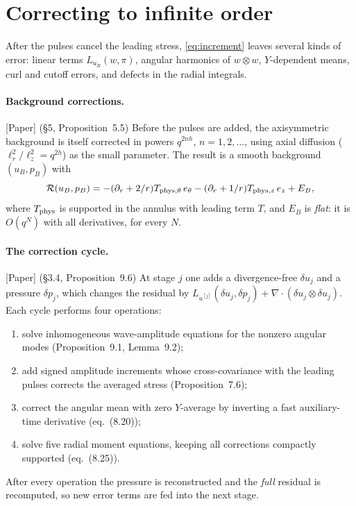 \documentclass[11pt]{article}
\newcommand{\Res}{\mathcal{R}}
\theoremstyle{plain}
\theoremstyle{remark}
\newcommand{\paper}{\textsf{\small[Paper]}}
\begin{document}
\section{Correcting to infinite order}\label{sec:cycle}

After the pulses cancel the leading stress, \eqref{eq:increment} leaves several kinds of error: linear terms $L_{u_B}(w,\pi)$, angular harmonics of $w\otimes w$, $Y$-dependent means, curl and cutoff errors, and defects in the radial integrals.

\paragraph{Background corrections.} \paper{} (\S5, Proposition~5.5) Before the pulses are added, the axisymmetric background is itself corrected in powers $q^{2nh}$, $n=1,2,\dots$, using axial diffusion ($\ell_r^2/\ell_z^2=q^{2h}$) as the small parameter. The result is a smooth background $(u_B,p_B)$ with
\[
\Res(u_B,p_B)=-(\partial_r+2/r)T_{{\rm phys},\theta}\,e_\theta-(\partial_r+1/r)T_{{\rm phys},z}\,e_z+E_B,
\]
where $T_{\rm phys}$ is supported in the annulus with leading term $T$, and $E_B$ is \emph{flat}: it is $O(q^N)$ with all derivatives, for every $N$.

\paragraph{The correction cycle.} \paper{} (\S3.4, Proposition~9.6) At stage $j$ one adds a divergence-free $\delta u_j$ and a pressure $\delta p_j$, which changes the residual by $L_{u^{[j]}}(\delta u_j,\delta p_j)+\nabla\cdot(\delta u_j\otimes\delta u_j)$. Each cycle performs four operations:
\begin{enumerate}[itemsep=1pt]
\item solve inhomogeneous wave-amplitude equations for the nonzero angular modes (Proposition~9.1, Lemma~9.2);
\item add signed amplitude increments whose cross-covariance with the leading pulses corrects the averaged stress (Proposition~7.6);
\item correct the angular mean with zero $Y$-average by inverting a fast auxiliary-time derivative (eq.~(8.20));
\item solve five radial moment equations, keeping all corrections compactly supported (eq.~(8.25)).
\end{enumerate}
After every operation the pressure is reconstructed and the \emph{full} residual is recomputed, so new error terms are fed into the next stage.
\end{document}
